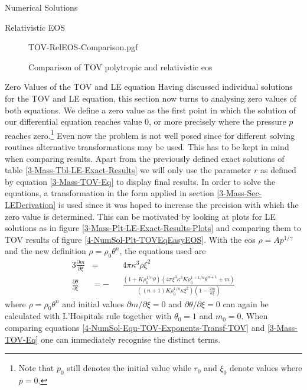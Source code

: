 \begin{section}{Numerical Solutions}
\begin{subsection}{Relativistic EOS}
\begin{figure}
	\centering
	{TOV-RelEOS-Comparison.pgf}
	\caption[Comparison of TOV polytropic and relativistic EOS]{Comparison of TOV polytropic and relativistic \acs{eos}}
	\label{4-NumSol-Plt-RelEOS-TOV-Comparison}
\end{figure}
\end{subsection}
%
%
\begin{subsection}{Zero Values of the TOV and LE equation}
\label{4-NumSol-Sec-TOV-Exponents}
Having discussed individual solutions for the \ac{TOV} and \ac{LE} equation, this section now turns to analysing zero values of both equations.
We define a zero value as the first point in which the solution of our differential equation reaches value $0$, or more precisely where the pressure $p$ reaches zero.\footnote{Note that $p_0$ still denotes the initial value while $r_0$ and $\xi_0$ denote values where $p=0$.}
Even now the problem is not well posed since for different solving routines alternative transformations may be used.
This has to be kept in mind when comparing results. 
Apart from the previously defined exact solutions of table \ref{3-Mass-Tbl-LE-Exact-Results} we will only use the parameter $r$ as defined by equation \eqref{3-Mass-TOV-Eq} to display final results.
In order to solve the equations, a transformation in the form applied in section \ref{3-Mass-Sec-LEDerivation} is used since it was hoped to increase the precision with which the zero value is determined.
This can be motivated by looking at plots for \ac{LE} solutions as in figure \ref{3-Mass-Plt-LE-Exact-Results-Plots} and comparing them to \ac{TOV} results of figure \ref{4-NumSol-Plt-TOVEqEasyEOS}.
With the \ac{eos} $\rho=Ap^{1/\gamma}$ and the new definition $\rho=\rho_0\theta^n$, the equations used are 
\begin{alignat}{3}
	\frac{\partial m}{\partial\xi} &= &&4\pi\kappa^3\rho\xi^2\\
	\frac{\partial\theta}{\partial\xi} &= -&&\frac{\left(1+K\rho_0^{1/n}\theta\right)\left(4\pi\xi^3\kappa^3K\rho_0^{1+1/n}\theta^{n+1}+ m\right)}{\left((n+1)K\rho_0^{1/n}\kappa\xi^2\right)\left(1-\frac{2 m}{\kappa\xi}\right)}
	\label{4-NumSol-Equ-TOV-Exponents-Transf-TOV}
\end{alignat}
where $\rho=\rho_0\theta^n$ and initial values $\partial m/\partial\xi=0$ and $\partial\theta/\partial\xi=0$ can again be calculated with L'Hospitals rule together with $\theta_0=1$ and $ m_0=0$.
When comparing equations \eqref{4-NumSol-Equ-TOV-Exponents-Transf-TOV} and \eqref{3-Mass-TOV-Eq} one can immediately recognise the distinct terms.

\end{subsection}
\end{section}
